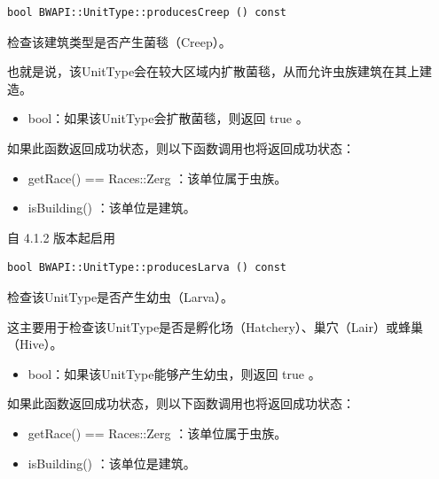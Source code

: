 \begin{tcolorbox}[colback=white, colframe=black!60!white, title=producesCreep(), arc=0mm]
    \begin{verbatim}
bool BWAPI::UnitType::producesCreep () const
    \end{verbatim}
    检查该建筑类型是否产生菌毯（Creep）。
    \par 也就是说，该UnitType会在较大区域内扩散菌毯，从而允许虫族建筑在其上建造。
    \begin{return}
        \begin{itemize}
            \item bool：如果该UnitType会扩散菌毯，则返回   true  。
        \end{itemize}
    \end{return}
    \begin{note}
        如果此函数返回成功状态，则以下函数调用也将返回成功状态：
        \begin{itemize}
            \item getRace() == Races::Zerg  ：该单位属于虫族。
            \item isBuilding()  ：该单位是建筑。
        \end{itemize}
    \end{note}
    自 4.1.2 版本起启用
\end{tcolorbox}


\begin{tcolorbox}[colback=white, colframe=black!60!white, title=producesLarva(), arc=0mm]
    \begin{verbatim}
bool BWAPI::UnitType::producesLarva () const
    \end{verbatim}
    检查该UnitType是否产生幼虫（Larva）。
    \par 这主要用于检查该UnitType是否是孵化场（Hatchery）、巢穴（Lair）或蜂巢（Hive）。
    \begin{return}
        \begin{itemize}
            \item bool：如果该UnitType能够产生幼虫，则返回   true  。
        \end{itemize}
    \end{return}
    \begin{note}
        如果此函数返回成功状态，则以下函数调用也将返回成功状态：
        \begin{itemize}
            \item getRace() == Races::Zerg  ：该单位属于虫族。
            \item isBuilding()  ：该单位是建筑。
        \end{itemize}
    \end{note}
\end{tcolorbox}


